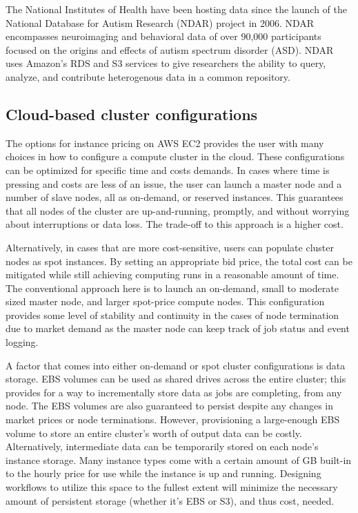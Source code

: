 \documentclass{frontiersSCNS} %
\begin{document}
    The National Institutes of Health have been hosting data since the launch of the National Database for Autism Research (NDAR) project in 2006. NDAR encompasses neuroimaging and behavioral data of over 90,000 participants focused on the origins and effects of autism spectrum disorder (ASD). NDAR uses Amazon’s RDS and S3 services to give researchers the ability to query, analyze, and contribute heterogenous data in a common repository.

\subsection{Cloud-based cluster configurations}
The options for instance pricing on AWS EC2 provides the user with many choices in how to configure a compute cluster in the cloud. These configurations can be optimized for specific time and costs demands. In cases where time is pressing and costs are less of an issue, the user can launch a master node and a number of slave nodes, all as on-demand, or reserved instances. This guarantees that all nodes of the cluster are up-and-running, promptly, and without worrying about interruptions or data loss. The trade-off to this approach is a higher cost.


Alternatively, in cases that are more cost-sensitive, users can populate cluster nodes as spot instances. By setting an appropriate bid price, the total cost can be mitigated while still achieving computing runs in a reasonable amount of time. The conventional approach here is to launch an on-demand, small to moderate sized master node, and larger spot-price compute nodes. This configuration provides some level of stability and continuity in the cases of node termination due to market demand as the master node can keep track of job status and event logging.


A factor that comes into either on-demand or spot cluster configurations is data storage. EBS volumes can be used as shared drives across the entire cluster; this provides for a way to incrementally store data as jobs are completing, from any node. The EBS volumes are also guaranteed to persist despite any changes in market prices or node terminations. However, provisioning a large-enough EBS volume to store an entire cluster’s worth of output data can be costly. Alternatively, intermediate data can be temporarily stored on each node’s instance storage. Many instance types come with a certain amount of GB built-in to the hourly price for use while the instance is up and running. Designing workflows to utilize this space to the fullest extent will minimize the necessary amount of persistent storage (whether it’s EBS or S3), and thus cost, needed.
\end{document}
